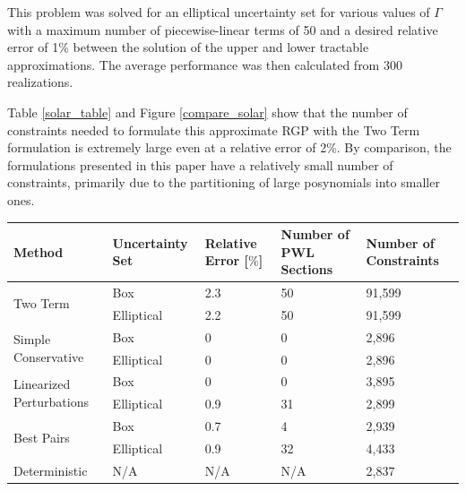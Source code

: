 This problem was solved for an elliptical uncertainty set for various values of $\Gamma$ with a maximum number of piecewise-linear terms of 50 and a desired relative error of 1\% between the solution of the upper and lower tractable approximations. The average performance was then calculated from 300 realizations.

Table \ref{solar_table} and Figure \ref{compare_solar} show that the number of constraints needed to formulate this approximate RGP with the Two Term formulation is extremely large even at a relative error of 2\%. By comparison, the formulations presented in this paper have a relatively small number of constraints, primarily due to the partitioning of large posynomials into smaller ones.

\begin{center}
\begin{tabular}{ |m{7em}|m{1.8cm}|m{1.5cm}|m{2.2cm}|m{1.8cm}| }
\hline
Method & Uncertainty Set & Relative Error [$\%$] & Number of PWL Sections & Number of Constraints \\
\hline
\multirow{2}{7em}{Two Term} & Box & 2.3 & 50 & 91,599\\ 
& Elliptical & 2.2 & 50 & 91,599\\
\hline
\multirow{2}{7em}{Simple Conservative} & Box & 0 & 0 & 2,896\\ 
& Elliptical & 0 & 0 & 2,896 \\
\hline
\multirow{2}{7em}{Linearized Perturbations} & Box & 0 & 0 & 3,895\\ 
& Elliptical & 0.9 & 31 & 2,899 \\  
\hline
\multirow{2}{7em}{Best Pairs} & Box & 0.7 & 4 & 2,939\\ 
& Elliptical & 0.9 & 32 & 4,433 \\
\hline
Deterministic & N/A & N/A & N/A & 2,837\\
\hline
\end{tabular}
\label{solar_table}
\end{center}

